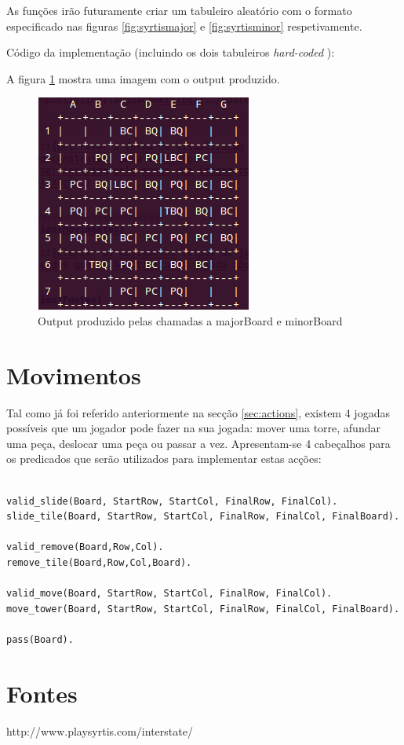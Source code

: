 \documentclass[a4paper]{article}
\begin{document}
As funções irão futuramente criar um tabuleiro aleatório com o formato especificado nas figuras \ref{fig:syrtismajor} e \ref{fig:syrtisminor} respetivamente.

Código da implementação (incluindo os dois tabuleiros \textit{hard-coded} ):



A figura \ref{fig:outputboard} mostra uma imagem com o output produzido.

\begin{figure}[h]
\centering
\includegraphics[scale=0.5]{outputboard.png}
\caption{Output produzido pelas chamadas a majorBoard e minorBoard}
\label{fig:outputboard}
\end{figure}


\section{Movimentos}

Tal como já foi referido anteriormente na secção \ref{sec:actions}, existem 4 jogadas possíveis que um jogador pode fazer na sua jogada: mover uma torre, afundar uma peça, deslocar uma peça ou passar a vez. Apresentam-se 4 cabeçalhos para os predicados que serão utilizados para implementar estas acções:

\begin{lstlisting}

valid_slide(Board, StartRow, StartCol, FinalRow, FinalCol).
slide_tile(Board, StartRow, StartCol, FinalRow, FinalCol, FinalBoard).

valid_remove(Board,Row,Col).
remove_tile(Board,Row,Col,Board).

valid_move(Board, StartRow, StartCol, FinalRow, FinalCol).
move_tower(Board, StartRow, StartCol, FinalRow, FinalCol, FinalBoard).

pass(Board).

\end{lstlisting}

\section{Fontes}

http://www.playsyrtis.com/interstate/
\end{document}
